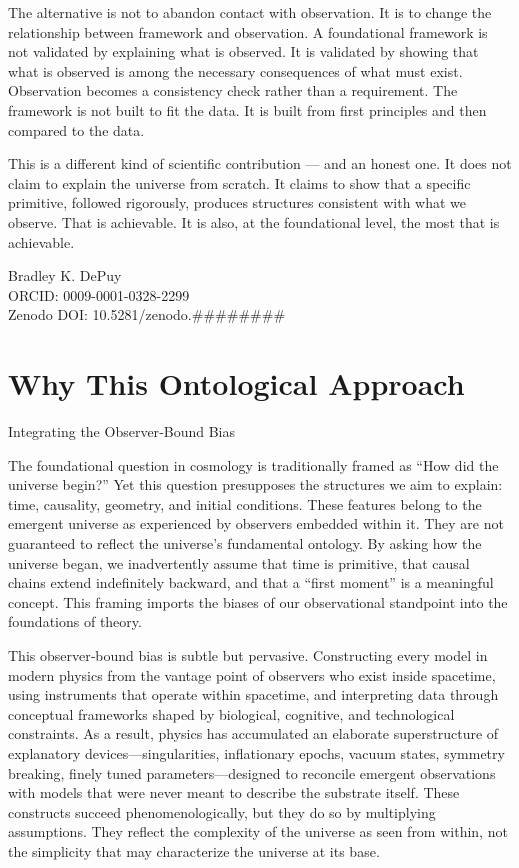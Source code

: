 \documentclass[11pt,letterpaper]{article}
\begin{document}
The alternative is not to abandon contact with observation. It is to change the relationship between framework and observation. A foundational framework is not validated by explaining what is observed. It is validated by showing that what is observed is among the necessary consequences of what must exist. Observation becomes a consistency check rather than a requirement. The framework is not built to fit the data. It is built from first principles and then compared to the data.

This is a different kind of scientific contribution — and an honest one. It does not claim to explain the universe from scratch. It claims to show that a specific primitive, followed rigorously, produces structures consistent with what we observe. That is achievable. It is also, at the foundational level, the most that is achievable.


Bradley K. DePuy\\
ORCID: 0009-0001-0328-2299\\
Zenodo DOI: 10.5281/zenodo.\#\#\#\#\#\#\#\#
\section{Why This Ontological Approach}
\label{sec:org9cf9e58}

Integrating the Observer‑Bound Bias

The foundational question in cosmology is traditionally framed as “How did the universe begin?” Yet this question presupposes the   structures we aim to explain: time, causality, geometry, and initial conditions. These features belong to the emergent universe as experienced by observers embedded within it. They are not guaranteed to reflect the universe’s fundamental ontology. By asking how the universe began, we inadvertently assume that time is primitive, that causal chains extend indefinitely backward, and that a “first moment” is a meaningful concept. This framing imports the biases of our observational standpoint into the foundations of theory.

This observer‑bound bias is subtle but pervasive. Constructing every model in modern physics from the vantage point of observers who exist inside spacetime, using instruments that operate within spacetime, and interpreting data through conceptual frameworks shaped by biological, cognitive, and technological constraints. As a result, physics has accumulated an elaborate superstructure of explanatory devices—singularities, inflationary epochs, vacuum states, symmetry breaking, finely tuned parameters—designed to reconcile emergent observations with models that were never meant to describe the substrate itself. These constructs succeed phenomenologically, but they do so by multiplying assumptions. They reflect the complexity of the universe as seen from within, not the simplicity that may characterize the universe at its base.
\end{document}
